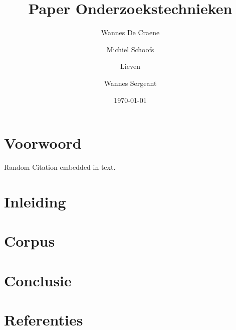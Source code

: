 \documentclass[12pt,a4paper]{article}
\author{Wannes {De Craene} \and Michiel Schoofs \and Lieven \and Wannes Sergeant}
\title{Paper Onderzoekstechnieken}
\date{\today}
\begin{document}
    
    \maketitle
    \tableofcontents
    \newpage
    \section{Voorwoord}
    
    Random Citation \cite{Auteur2019} embedded in text.
    \section{Inleiding}
    
    
    \section{Corpus}
    
    
    \section{Conclusie}
    
    \newpage
    \section{Referenties}

    \printbibliography
    
\end{document}
